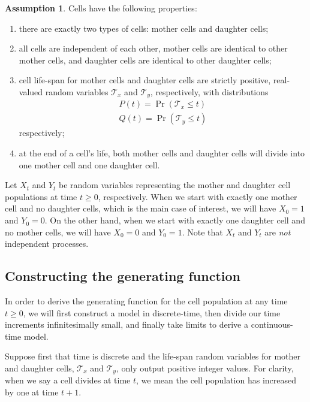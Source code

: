 \documentclass[12pt]{amsart}
\theoremstyle{plain}
\theoremstyle{definition}
\theoremstyle{remark}
\theoremstyle{definition}
\newtheorem{assume}[thm]{Assumption}
\begin{document}
\begin{assume}Cells have the following properties:
\begin{enumerate}
\item there are exactly two types of cells: mother cells and daughter cells;
\item all cells are independent of each other, mother cells are identical to other mother cells, and daughter cells are identical to other daughter cells;
\item cell life-span for mother cells and daughter cells are strictly positive, real-valued random variables $\mathcal{T}_x$ and $\mathcal{T}_y$, respectively, with distributions
\begin{equation}
\begin{aligned}
P(t) = \Pr(\mathcal{T}_x \leq t) \\
Q(t) = \Pr(\mathcal{T}_y \leq t)
\end{aligned}
\end{equation}
respectively;
\item at the end of a cell's life, both mother cells and daughter cells will divide into one mother cell and one daughter cell.
\end{enumerate}
\end{assume}

Let $X_t$ and $Y_t$ be random variables representing the mother and daughter cell populations at time $t \geq 0$, respectively. When we start with exactly one mother cell and no daughter cells, which is the main case of interest, we will have $X_0 = 1$ and $Y_0 = 0$. On the other hand, when we start with exactly one daughter cell and no mother cells, we will have $X_0 = 0$ and $Y_0 = 1$. Note that $X_t$ and $Y_t$ are \emph{not} independent processes.

\subsection{Constructing the generating function}

In order to derive the generating function for the cell population at any time $t \geq 0$, we will first construct a model in discrete-time, then divide our time increments infinitesimally small, and finally take limits to derive a continuous-time model.

Suppose first that time is discrete and the life-span random variables for mother and daughter cells, $\mathcal{T}_x$ and $\mathcal{T}_y$, only output positive integer values. For clarity, when we say a cell divides at time $t$, we mean the cell population has increased by one at time $t+1$.
\end{document}
